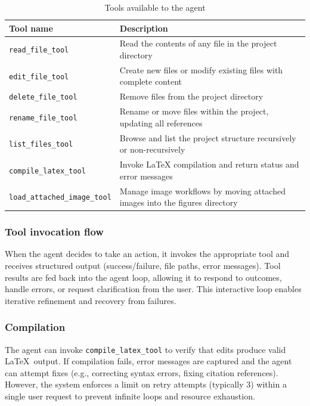\begin{table}[htbp]
\centering
\begin{tabular}{|l|p{8cm}|}
\hline
\textbf{Tool name} & \textbf{Description} \\
\hline
\texttt{read\_file\_tool} & Read the contents of any file in the project directory \\
\hline
\texttt{edit\_file\_tool} & Create new files or modify existing files with complete content \\
\hline
\texttt{delete\_file\_tool} & Remove files from the project directory \\
\hline
\texttt{rename\_file\_tool} & Rename or move files within the project, updating all references \\
\hline
\texttt{list\_files\_tool} & Browse and list the project structure recursively or non-recursively \\
\hline
\texttt{compile\_latex\_tool} & Invoke LaTeX compilation and return status and error messages \\
\hline
\texttt{load\_attached\_image\_tool} & Manage image workflows by moving attached images into the figures directory \\
\hline
\end{tabular}
\caption{Tools available to the agent}
\label{tab:agent_tools}
\end{table}

\subsubsection{Tool invocation flow}

When the agent decides to take an action, it invokes the appropriate tool and receives structured output (success/failure, file paths, error messages).
Tool results are fed back into the agent loop, allowing it to respond to outcomes, handle errors, or request clarification from the user.
This interactive loop enables iterative refinement and recovery from failures.

\subsubsection{Compilation}

The agent can invoke \texttt{compile\_latex\_tool} to verify that edits produce valid \LaTeX\ output.
If compilation fails, error messages are captured and the agent can attempt fixes (e.g., correcting syntax errors, fixing citation references).
However, the system enforces a limit on retry attempts (typically 3) within a single user request to prevent infinite loops and resource exhaustion.

